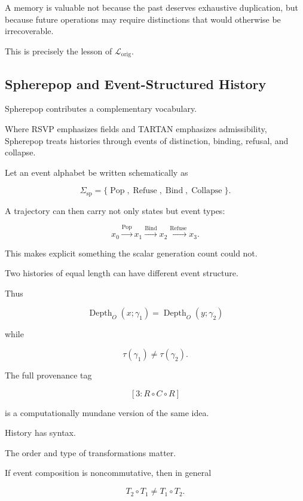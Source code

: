 \documentclass[
  11pt,
  a4paper,
  DIV=12,
  BCOR=0mm,
  parskip=half-
]{scrartcl}
\newcommand{\lossorig}{%
  \mathscr L_{\mathrm{orig}}%
}
\newcommand{\Depth}{\operatorname{Depth}}
\newcommand{\Pop}{\operatorname{Pop}}
\newcommand{\Refuse}{\operatorname{Refuse}}
\newcommand{\Bind}{\operatorname{Bind}}
\newcommand{\Collapse}{\operatorname{Collapse}}
\theoremstyle{definition}
\theoremstyle{plain}
\theoremstyle{remark}
\begin{document}
A memory is valuable not because the past deserves exhaustive duplication,
but because future operations may require distinctions that would otherwise
be irrecoverable.

This is precisely the lesson of \(\lossorig\).


\subsection{Spherepop and Event-Structured History}
\label{sec:spherepop}

Spherepop contributes a complementary vocabulary.

Where RSVP emphasizes fields and TARTAN emphasizes admissibility, Spherepop
treats histories through events of distinction, binding, refusal, and
collapse.

Let an event alphabet be written schematically as

\[
  \Sigma_{\mathrm{sp}}
  =
  \{
  \Pop,
  \Refuse,
  \Bind,
  \Collapse
  \}.
\]

A trajectory can then carry not only states but event types:

\[
  x_0
  \xrightarrow{\Pop}
  x_1
  \xrightarrow{\Bind}
  x_2
  \xrightarrow{\Refuse}
  x_3.
\]

This makes explicit something the scalar generation count could not.

Two histories of equal length can have different event structure.

Thus

\[
  \Depth_O(x;\gamma_1)
  =
  \Depth_O(y;\gamma_2)
\]

while

\[
  \tau(\gamma_1)\neq\tau(\gamma_2).
\]

The full provenance tag

\[
  [3:R\circ C\circ R]
\]

is a computationally mundane version of the same idea.

History has syntax.

The order and type of transformations matter.

If event composition is noncommutative, then in general

\[
  T_2\circ T_1
  \neq
  T_1\circ T_2.
\]
\end{document}
